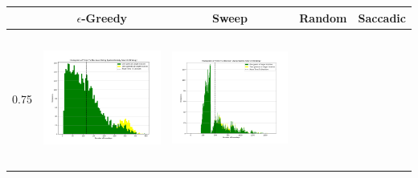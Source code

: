 \begin{landscape}
\begin{table}[h!]
  \centering
  \begin{tabular}{ | c | c | c | c | c |}
    \hline
    & $\epsilon$-Greedy & Sweep & Random & Saccadic \\
    \hline
    0.75 & \vline
    \begin{minipage}[c][45mm][c]{45mm}
      \includegraphics[width=44mm, height=44mm]{Chapters/MultiAgentTargetDetection/Figs/Histograms/VaryingInitBelief/75/75EpsilonGreedyHistogram.png}
    \end{minipage}
    &
    \begin{minipage}[c][45mm][c]{45mm}
      \includegraphics[width=44mm, height=44mm]{Chapters/MultiAgentTargetDetection/Figs/Histograms/VaryingInitBelief/75/75SweepHistogram.png}


\end{minipage}
\end{tabular}
\end{table}
\end{landscape}
